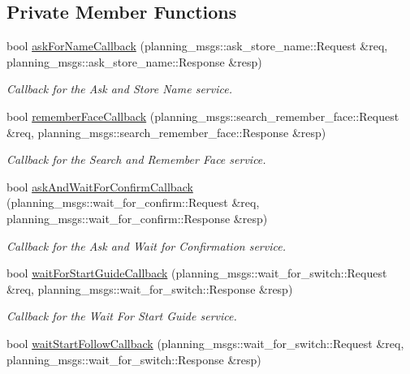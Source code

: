 \subsection*{Private Member Functions}
\begin{DoxyCompactItemize}
\item 
bool \hyperlink{class_task_advertiser_a33255a263998aa137f442504d8438be8}{ask\+For\+Name\+Callback} (planning\+\_\+msgs\+::ask\+\_\+store\+\_\+name\+::\+Request \&req, planning\+\_\+msgs\+::ask\+\_\+store\+\_\+name\+::\+Response \&resp)
\begin{DoxyCompactList}\small\item\em Callback for the Ask and Store Name service. \end{DoxyCompactList}\item 
bool \hyperlink{class_task_advertiser_af9a75fa9dc0093208d0a540be856a732}{remember\+Face\+Callback} (planning\+\_\+msgs\+::search\+\_\+remember\+\_\+face\+::\+Request \&req, planning\+\_\+msgs\+::search\+\_\+remember\+\_\+face\+::\+Response \&resp)
\begin{DoxyCompactList}\small\item\em Callback for the Search and Remember Face service. \end{DoxyCompactList}\item 
bool \hyperlink{class_task_advertiser_a12d4edf2bc4c98b845b59c13a48b1cff}{ask\+And\+Wait\+For\+Confirm\+Callback} (planning\+\_\+msgs\+::wait\+\_\+for\+\_\+confirm\+::\+Request \&req, planning\+\_\+msgs\+::wait\+\_\+for\+\_\+confirm\+::\+Response \&resp)
\begin{DoxyCompactList}\small\item\em Callback for the Ask and Wait for Confirmation service. \end{DoxyCompactList}\item 
bool \hyperlink{class_task_advertiser_ac2e47bae96082ecbdc420825bbfdb23a}{wait\+For\+Start\+Guide\+Callback} (planning\+\_\+msgs\+::wait\+\_\+for\+\_\+switch\+::\+Request \&req, planning\+\_\+msgs\+::wait\+\_\+for\+\_\+switch\+::\+Response \&resp)
\begin{DoxyCompactList}\small\item\em Callback for the Wait For Start Guide service. \end{DoxyCompactList}\item 
bool \hyperlink{class_task_advertiser_a6eafba7d6ba3c65ed7464e146682921f}{wait\+Start\+Follow\+Callback} (planning\+\_\+msgs\+::wait\+\_\+for\+\_\+switch\+::\+Request \&req, planning\+\_\+msgs\+::wait\+\_\+for\+\_\+switch\+::\+Response \&resp)

\end{DoxyCompactItemize}
